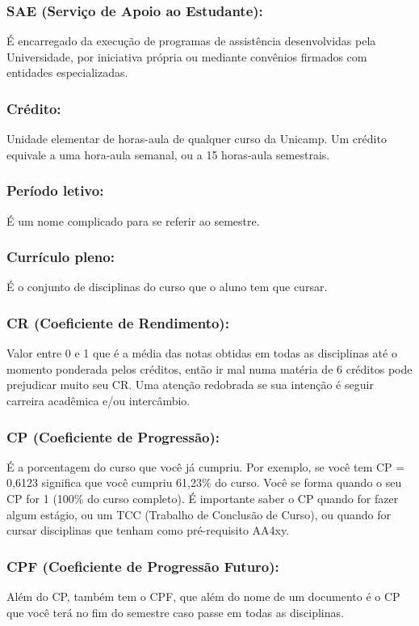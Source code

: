 \subsubsection{SAE (Serviço de Apoio ao Estudante):} É encarregado da execução
de programas de assistência desenvolvidas pela Universidade, por iniciativa
própria ou mediante convênios firmados com entidades especializadas.

\subsubsection{Crédito:} Unidade elementar de horas-aula de qualquer curso da
Unicamp. Um crédito equivale a uma hora-aula semanal, ou a 15 horas-aula
semestrais.

\subsubsection{Período letivo:} É um nome complicado para se referir ao
semestre.

\subsubsection{Currículo pleno:} É o conjunto de disciplinas do curso que o
aluno tem que cursar.

\subsubsection{CR (Coeficiente de Rendimento):} Valor entre 0 e 1 que é a média
das notas obtidas em todas as disciplinas até o momento ponderada pelos
créditos, então ir mal numa matéria de 6 créditos pode prejudicar muito seu CR.
Uma atenção redobrada se sua intenção é seguir carreira acadêmica e/ou
intercâmbio.

\subsubsection{CP (Coeficiente de Progressão):} É a porcentagem do curso que
você já cumpriu. Por exemplo, se você tem CP = 0,6123 significa que você
cumpriu 61,23\% do curso. Você se forma quan\-do o seu CP for 1 (100\% do curso
completo). É importante saber o CP quando for fazer algum estágio, ou um TCC
(Trabalho de Conclusão de Curso), ou quando for cursar disciplinas que tenham
como pré-requisito AA4xy.

\subsubsection{CPF (Coeficiente de Progressão Futuro):} Além do CP, também tem
o CPF, que além do nome de um documento é o CP que você terá no fim do semestre
caso passe em todas as disciplinas.

